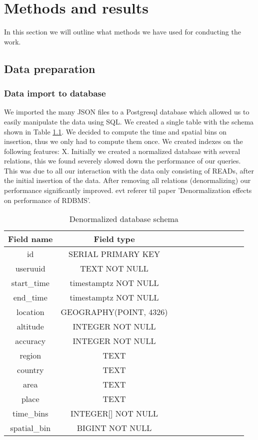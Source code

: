 \chapter{Methods and results}
In this section we will outline what methods we have used for conducting the work.
\section{Data preparation}
\subsection{Data import to database}
We imported the many JSON files to a Postgresql database which allowed us to easily manipulate the data using SQL. We created a single table with the schema shown in Table \ref{table:schema_denormalized}. We decided to compute the time and spatial bins on insertion, thus we only had to compute them once. We created indexes on the following features: X.
Initially we created a normalized database with several relations, this we found severely slowed down the performance of our queries. This was due to all our interaction with the data only consisting of READs, after the initial insertion of the data. After removing all relations (denormalizing) our performance significantly improved. {\color{red} evt referer til paper 'Denormalization effects on performance of RDBMS'}.
\begin{table}[htbp]
\centering

\begin{tabular}{|c|c|c|c|c|c|c|c|c|c|c|}
\hline
\textbf{Field name} & \textbf{Field type}    \\
\hline
id                  & SERIAL PRIMARY KEY     \\
\hline
useruuid            & TEXT NOT NULL          \\
\hline
start\_time         & timestamptz NOT NULL   \\
\hline
end\_time           & timestamptz NOT NULL   \\
\hline
location            & GEOGRAPHY(POINT, 4326) \\
\hline
altitude            & INTEGER NOT NULL       \\
\hline
accuracy            & INTEGER NOT NULL       \\
\hline
region              & TEXT                   \\
\hline
country             & TEXT                   \\
\hline
area                & TEXT                   \\
\hline
place               & TEXT                   \\
\hline
time\_bins          & INTEGER{[}{]} NOT NULL \\
\hline
spatial\_bin        & BIGINT NOT NULL        \\
\hline
\end{tabular}
\caption{Denormalized database schema}
\label{table:schema_denormalized}
\end{table}
